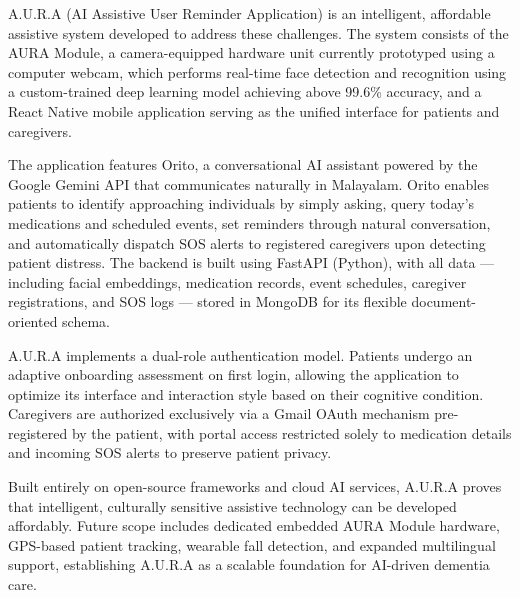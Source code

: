 \documentclass[12pt,a4paper]{report}
\begin{document}
A.U.R.A (AI Assistive User Reminder Application) is an intelligent, 
affordable assistive system developed to address these challenges. The system 
consists of the AURA Module, a camera-equipped hardware unit currently 
prototyped using a computer webcam, which performs real-time face detection 
and recognition using a custom-trained deep learning model achieving above 
99.6\% accuracy, and a React Native mobile application serving as the unified 
interface for patients and caregivers.

The application features Orito, a conversational AI assistant powered by the 
Google Gemini API that communicates naturally in Malayalam. Orito enables 
patients to identify approaching individuals by simply asking, query today's 
medications and scheduled events, set reminders through natural conversation, 
and automatically dispatch SOS alerts to registered caregivers upon detecting 
patient distress. The backend is built using FastAPI (Python), with all data 
--- including facial embeddings, medication records, event schedules, 
caregiver registrations, and SOS logs --- stored in MongoDB for its flexible 
document-oriented schema.

A.U.R.A implements a dual-role authentication model. Patients undergo an 
adaptive onboarding assessment on first login, allowing the application to 
optimize its interface and interaction style based on their cognitive 
condition. Caregivers are authorized exclusively via a Gmail OAuth mechanism 
pre-registered by the patient, with portal access restricted solely to 
medication details and incoming SOS alerts to preserve patient privacy.

Built entirely on open-source frameworks and cloud AI services, A.U.R.A 
proves that intelligent, culturally sensitive assistive technology can be 
developed affordably. Future scope includes dedicated embedded AURA Module 
hardware, GPS-based patient tracking, wearable fall detection, and expanded 
multilingual support, establishing A.U.R.A as a scalable foundation for 
AI-driven dementia care.

\newpage
\tableofcontents

\newpage
\listoftables
{}

\newpage
\listoffigures
{}
\end{document}
